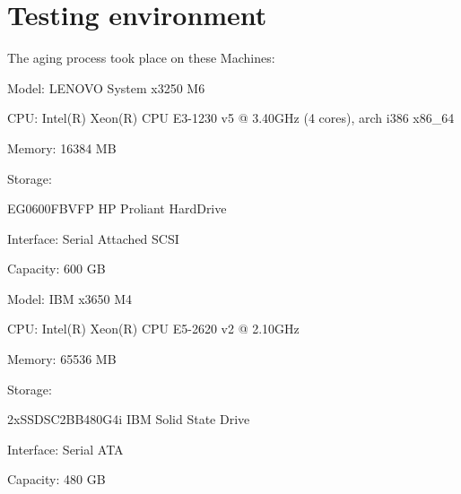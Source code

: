 \documentclass[
  color, %
  table, %
  lof,   %
  lot,   %
]{fithesis3}
\begin{document}





\chapter{Testing environment}
The aging process took place on these Machines:
\begin{compactenum}
  \item Model: LENOVO System x3250 M6
  \item CPU: Intel(R) Xeon(R) CPU E3-1230 v5 @ 3.40GHz (4 cores), arch i386 x86\_64 
  \item Memory: 16384 MB
  \item Storage: 
  \begin{compactenum}
	\item EG0600FBVFP HP Proliant HardDrive
	\item Interface: Serial Attached SCSI
	\item Capacity: 600 GB
	\end{compactenum}
\end{compactenum}  


\begin{compactenum}
  \item Model: IBM x3650 M4
  \item CPU: Intel(R) Xeon(R) CPU E5-2620 v2 @ 2.10GHz 
  \item Memory: 65536 MB
  \item Storage:
  \begin{compactenum}
	\item 2xSSDSC2BB480G4i IBM Solid State Drive
	\item Interface: Serial ATA
	\item Capacity: 480 GB
	\end{compactenum}
\end{compactenum}
\end{document}
